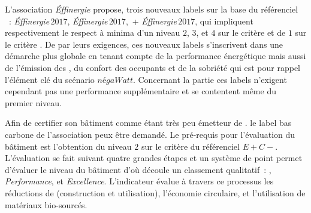 L’association \textit{Éffinergie} propose, trois nouveaux labels sur la base du référenciel
~:  \textit{Éffinergie}\,$2017$,  \textit{Éffinergie}\,$2017$,
\,+ \textit{Éffinergie}\,$2017$, qui impliquent respectivement le respect à
minima d’un niveau $2$, $3$, et $4$ sur le critère  et de $1$ sur le critère .
De par leurs exigences, ces nouveaux labels s’inscrivent dans une
démarche plus globale en tenant compte de la performance énergétique mais aussi de
l’émission des , du confort des occupants et de la sobriété qui est pour rappel
l’élément clé du scénario $négaWatt$.
Concernant la partie  ces labels n’exigent cependant pas une performance
supplémentaire et se contentent même du premier niveau.

Afin de certifier son bâtiment comme étant très peu émetteur de .
le label bas carbone de l’association
peux être demandé. Le pré-requis pour l’évaluation du bâtiment est l’obtention
du niveau $2$ sur le critère  du référenciel $E+C-$. L’évaluation se fait
suivant quatre grandes étapes et un système de point permet d’évaluer le niveau du
bâtiment d’où découle un classement qualitatif~: , 
\textit{Performance}, et  \textit{Excellence}. L’indicateur évalue à travers ce
processus les réductions de  (construction et utilisation), l’économie
circulaire, et l’utilisation de matériaux bio-sourcés.

